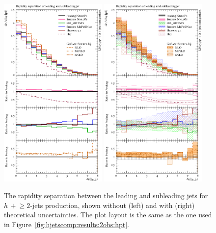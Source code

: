 \begin{figure}[t!]
  \centering
  \includegraphics[width=0.47\textwidth]{figures/hjetscomp_u_deltay_jj.pdf}
  \hfill
  \includegraphics[width=0.47\textwidth]{figures/hjetscomp_deltay_jj.pdf}
  \caption{\label{fig:hjetscomp:results:2obs:dyjj}%
    The rapidity separation between the leading and subleading jets
    for $h\,+\!\ge\!2$-jets production, shown without (left) and with
    (right) theoretical uncertainties. The plot layout is the same as
    the one used in Figure~\ref{fig:hjetscomp:results:2obs:hpt}.}
\end{figure}

